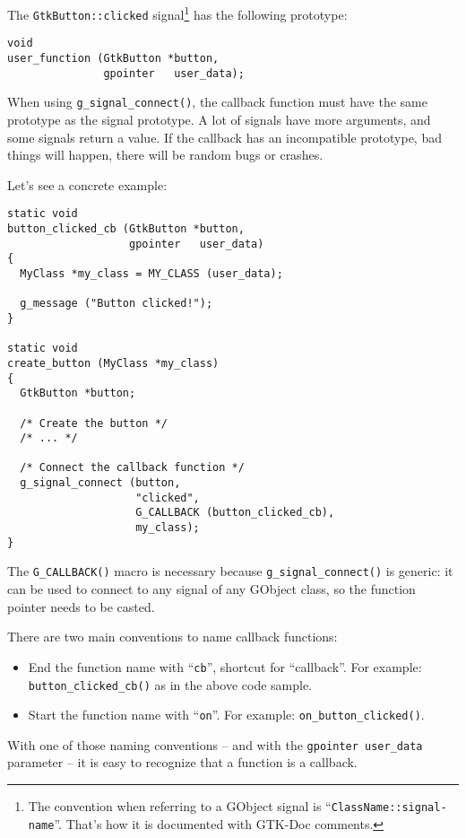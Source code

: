 The \lstinline{GtkButton::clicked} signal\footnote{The convention when referring to a GObject signal is ``\lstinline{ClassName::signal-name}''. That's how it is documented with GTK-Doc comments.} has the following prototype:
\begin{lstlisting}
void
user_function (GtkButton *button,
               gpointer   user_data);
\end{lstlisting}

When using \lstinline{g_signal_connect()}, the callback function must have the same prototype as the signal prototype. A lot of signals have more arguments, and some signals return a value. If the callback has an incompatible prototype, bad things will happen, there will be random bugs or crashes.

Let's see a concrete example:
\begin{lstlisting}
static void
button_clicked_cb (GtkButton *button,
                   gpointer   user_data)
{
  MyClass *my_class = MY_CLASS (user_data);

  g_message ("Button clicked!");
}

static void
create_button (MyClass *my_class)
{
  GtkButton *button;

  /* Create the button */
  /* ... */

  /* Connect the callback function */
  g_signal_connect (button,
                    "clicked",
                    G_CALLBACK (button_clicked_cb),
                    my_class);
}
\end{lstlisting}

The \lstinline{G_CALLBACK()} macro is necessary because \lstinline{g_signal_connect()} is generic: it can be used to connect to any signal of any GObject class, so the function pointer needs to be casted.

There are two main conventions to name callback functions:
\begin{itemize}
  \item End the function name with ``\lstinline{cb}'', shortcut for ``callback''. For example: \lstinline{button_clicked_cb()} as in the above code sample.
  \item Start the function name with ``\lstinline{on}''. For example: \lstinline{on_button_clicked()}.
\end{itemize}

With one of those naming conventions -- and with the \lstinline{gpointer user_data} parameter -- it is easy to recognize that a function is a callback.

